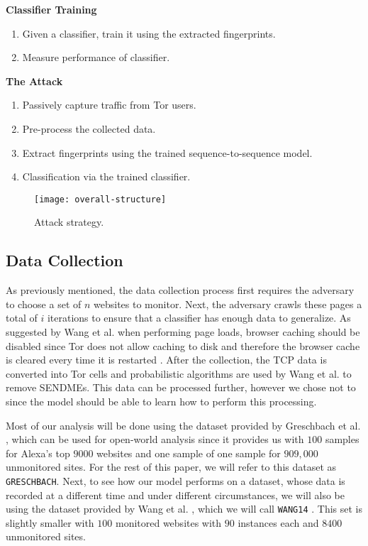 \noindent
\textbf{Classifier Training}
\begin{enumerate}[resume]
  \item Given a classifier, train it using the extracted fingerprints.
  \item Measure performance of classifier.
\end{enumerate}

\newpage

\noindent
\textbf{The Attack}
\begin{enumerate}[resume]
  \item Passively capture traffic from Tor users.
  \item Pre-process the collected data.
  \item Extract fingerprints using the trained sequence-to-sequence model.
  \item Classification via the trained classifier.
\end{enumerate}

\begin{figure}[ht]
  \centering
  \texttt{[image: overall-structure]}
  \caption{Attack strategy.}
  \label{fig:attack-strategy}
\end{figure}

\subsection{Data Collection} \label{sec:data_collection1}

As previously mentioned, the data collection process first requires the adversary to choose a set of $n$ websites to monitor.
Next, the adversary crawls these pages a total of $i$ iterations to ensure that a classifier has enough data to generalize.
As suggested by Wang et al. when performing page loads, browser caching should be disabled since Tor does not allow caching to disk and therefore the browser cache is cleared every time it is restarted \cite{wang_goldberg_2013}.
After the collection, the TCP data is converted into Tor cells and probabilistic algorithms are used by Wang et al. \cite{wang_goldberg_2013} to remove SENDMEs.
This data can be processed further, however we chose not to since the model should be able to learn how to perform this processing.

Most of our analysis will be done using the dataset provided by Greschbach et al. \cite{greschbach2016effect}, which can be used for open-world analysis since it provides us with $100$ samples for Alexa's top $9000$ websites and one sample of one sample for $909,000$ unmonitored sites.
For the rest of this paper, we will refer to this dataset as \texttt{GRESCHBACH}.
Next, to see how our model performs on a dataset, whose data is recorded at a different time and under different circumstances, we will also be using the dataset provided by Wang et al. \cite{wang_cai_johnson_nithyanand_goldberg_2014}, which we will call \texttt{WANG14} \cite{panchenko2}.
This set is slightly smaller with $100$ monitored websites with $90$ instances each and $8400$ unmonitored sites.

